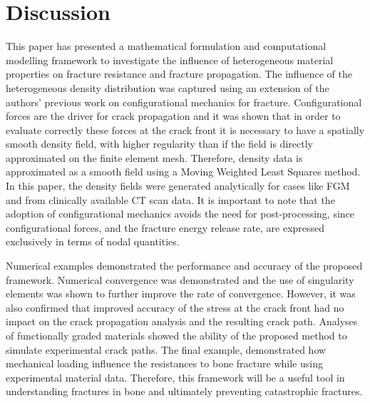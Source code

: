\documentclass[onecolumn]{svjour3}
\begin{document}
% 
\section{Discussion}\label{sec:discussion}
This paper has presented a mathematical formulation and computational modelling framework to investigate the 
influence of heterogeneous material properties on fracture resistance and fracture propagation. 
The influence of the heterogeneous density distribution was captured using an extension of the authors' previous work on configurational mechanics for fracture. 
Configurational forces are the driver for crack propagation and it was shown that in order to evaluate correctly these forces at the crack front it is necessary to have a spatially smooth density field, with higher regularity than if the field is directly approximated on the finite element mesh. 
Therefore, density data is approximated as a smooth field using a Moving Weighted Least Squares method. 
In this paper, the density fields were generated analytically for cases like FGM and from clinically available CT scan data. 
It is important to note that the adoption of configurational mechanics avoids the need for post-processing, since configurational forces, and the fracture energy release rate, are expressed exclusively in terms of nodal quantities.


Numerical examples demonstrated the performance and accuracy of the proposed framework. 
Numerical convergence was demonstrated and the use of singularity elements was shown to further improve the rate of convergence. 
However, it was also confirmed that improved accuracy of the stress at the crack front had no impact on the crack propagation analysis and the resulting crack path. 
Analyses of functionally graded materials showed the ability of the proposed method to simulate experimental crack paths. 
The final example, demonstrated how mechanical loading influence the resistances to bone fracture while using experimental material data. 
Therefore, this framework will be a useful tool in understanding fractures in bone and ultimately preventing catastrophic fractures. 
\end{document}
